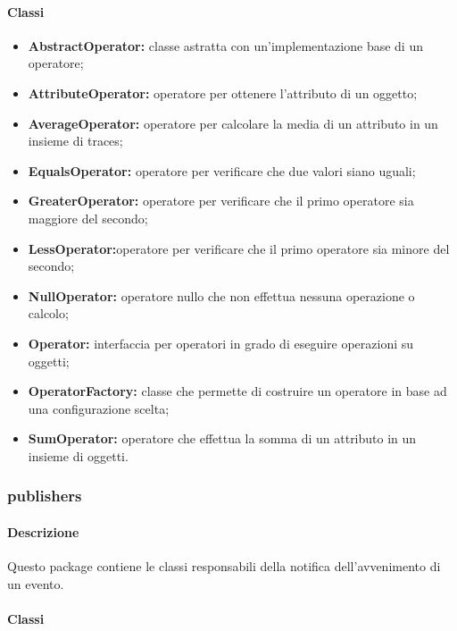 		\paragraph*{Classi}
		\begin{itemize}	
			\item \textbf{AbstractOperator:} classe astratta con un'implementazione base di un operatore;
			\item \textbf{AttributeOperator:} operatore per ottenere l'attributo di un oggetto;
			\item \textbf{AverageOperator:} operatore per calcolare la media di un attributo in un 
				insieme di traces;
			\item \textbf{EqualsOperator:} operatore per verificare che due valori siano uguali;
			\item \textbf{GreaterOperator:} operatore per verificare che il primo operatore sia maggiore 
				del secondo;
			\item \textbf{LessOperator:}operatore per verificare che il primo operatore sia minore 
				del secondo;
			\item \textbf{NullOperator:} operatore nullo che non effettua nessuna operazione o calcolo;
			\item \textbf{Operator:} interfaccia per operatori in grado di eseguire operazioni su oggetti;
			\item \textbf{OperatorFactory:} classe che  permette di 	
				costruire un operatore in base ad una configurazione scelta;
			\item \textbf{SumOperator:} operatore che effettua la somma di un attributo in un insieme di oggetti.
		\end{itemize}

\newpage
		
	\subsubsection{publishers}
		
		\paragraph*{Descrizione}
			Questo package contiene le classi responsabili della notifica dell'avvenimento di un evento.
		
		\paragraph*{Classi}
		
